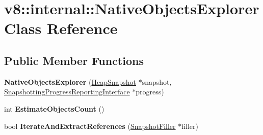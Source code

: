 \hypertarget{classv8_1_1internal_1_1_native_objects_explorer}{}\section{v8\+:\+:internal\+:\+:Native\+Objects\+Explorer Class Reference}
\label{classv8_1_1internal_1_1_native_objects_explorer}
\subsection*{Public Member Functions}
\begin{DoxyCompactItemize}
\item 
{\bfseries Native\+Objects\+Explorer} (\hyperlink{classv8_1_1internal_1_1_heap_snapshot}{Heap\+Snapshot} $\ast$snapshot, \hyperlink{classv8_1_1internal_1_1_snapshotting_progress_reporting_interface}{Snapshotting\+Progress\+Reporting\+Interface} $\ast$progress)\hypertarget{classv8_1_1internal_1_1_native_objects_explorer_a9772f761664e9cd0b73dca9bf9d21ad2}{}\label{classv8_1_1internal_1_1_native_objects_explorer_a9772f761664e9cd0b73dca9bf9d21ad2}

\item 
int {\bfseries Estimate\+Objects\+Count} ()\hypertarget{classv8_1_1internal_1_1_native_objects_explorer_a56adf5cff392cc3b6e569daf5d401647}{}\label{classv8_1_1internal_1_1_native_objects_explorer_a56adf5cff392cc3b6e569daf5d401647}

\item 
bool {\bfseries Iterate\+And\+Extract\+References} (\hyperlink{classv8_1_1internal_1_1_snapshot_filler}{Snapshot\+Filler} $\ast$filler)\hypertarget{classv8_1_1internal_1_1_native_objects_explorer_a0c854bc1ee0987dfadc1e226d69f4d2f}{}\label{classv8_1_1internal_1_1_native_objects_explorer_a0c854bc1ee0987dfadc1e226d69f4d2f}

\end{DoxyCompactItemize}
